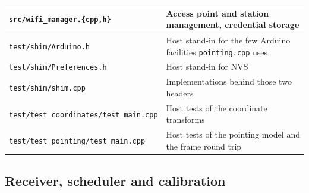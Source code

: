 \documentclass[11pt,a4paper]{article}
\begin{document}
\begin{table}[H]
\begin{tabular}{lp{9.4cm}}
\texttt{src/wifi\_manager.\{cpp,h\}} & Access point and station management, credential storage \\
\midrule
\texttt{test/shim/Arduino.h} & Host stand-in for the few Arduino facilities \texttt{pointing.cpp} uses \\
\texttt{test/shim/Preferences.h} & Host stand-in for NVS \\
\texttt{test/shim/shim.cpp} & Implementations behind those two headers \\
\texttt{test/test\_coordinates/test\_main.cpp} & Host tests of the coordinate transforms \\
\texttt{test/test\_pointing/test\_main.cpp} & Host tests of the pointing model and the frame round trip \\
\bottomrule
\end{tabular}
\end{table}

\subsection{Receiver, scheduler and calibration}
\end{document}
